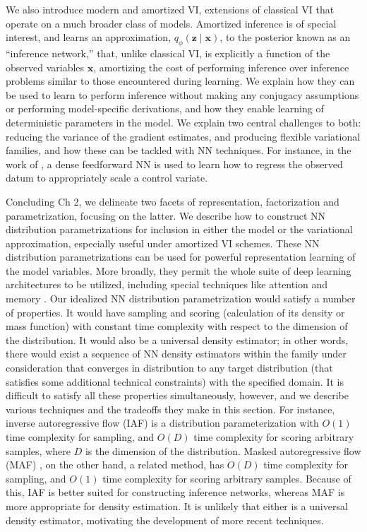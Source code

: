 We also introduce modern and amortized VI, extensions of classical VI that operate on a much broader class of models. Amortized inference is of special interest, and learns an approximation, $q_\phi(\mathbf{z}\mid\mathbf{x})$, to the posterior known as an ``inference network,'' that, unlike classical VI, is explicitly a function of the observed variables $\mathbf{x}$, amortizing the cost of performing inference over inference problems similar to those encountered during learning. We explain how they can be used to learn to perform inference without making any conjugacy assumptions or performing model-specific derivations, and how they enable learning of deterministic parameters in the model. We explain two central challenges to both: reducing the variance of the gradient estimates, and producing flexible variational families, and how these can be tackled with NN techniques. For instance, in the work of \citep{MnihGregor2014}, a dense feedforward NN is used to learn how to regress the observed datum to appropriately scale a control variate.

Concluding Ch 2, we delineate two facets of representation, factorization and parametrization, focusing on the latter. We describe how to construct NN distribution parametrizations for inclusion in either the model or the variational approximation, especially useful under amortized VI schemes. These NN distribution parametrizations can be used for powerful representation learning of the model variables. More broadly, they permit the whole suite of deep learning architectures to be utilized, including special techniques like attention \citep{eslami2016attend} and memory \citep{bornschein2017variational}. Our idealized NN distribution parametrization would satisfy a number of properties. It would have sampling and scoring (calculation of its density or mass function) with constant time complexity with respect to the dimension of the distribution. It would also be a universal density estimator; in other words, there would exist a sequence of NN density estimators within the family under consideration that converges in distribution to any target distribution (that satisfies some additional technical constraints) with the specified domain. It is difficult to satisfy all these properties simultaneously, however, and we describe various techniques and the tradeoffs they make in this section. For instance, inverse autoregressive flow (IAF) \citep{KingmaEtAl2016} is a distribution parameterization with $O(1)$ time complexity for sampling, and $O(D)$ time complexity for scoring arbitrary samples, where $D$ is the dimension of the distribution. Masked autoregressive flow (MAF) \citep{papamakarios2017masked}, on the other hand, a related method, has  $O(D)$ time complexity for sampling, and $O(1)$ time complexity for scoring arbitrary samples. Because of this, IAF is better suited for constructing inference networks, whereas MAF is more appropriate for density estimation. It is unlikely that either is a universal density estimator, motivating the development of more recent techniques.

